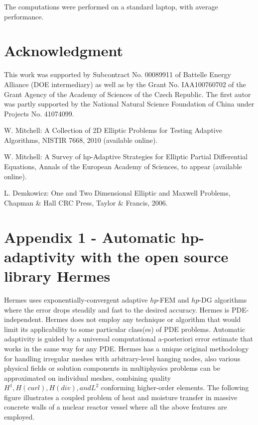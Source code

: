 \documentclass[12pt]{elsarticle}
\begin{document}
The computations were performed on a standard laptop, with average performance.

\section{Acknowledgment}

This work was supported by Subcontract No. 00089911 of Battelle
Energy Alliance (DOE intermediary) as well as by the
Grant No. IAA100760702 of the Grant Agency of the Academy
of Sciences of the Czech Republic. The first autor was partly
supported by the National Natural Science Foundation
of China under Projects No. 41074099.

\begin{thebibliography}{[KLR73]}

W. Mitchell: A Collection of 2D Elliptic Problems for
Testing Adaptive Algorithms, NISTIR 7668, 2010 (available online).

W. Mitchell: A Survey of hp-Adaptive Strategies for Elliptic Partial Differential Equations,
Annals of the European Academy of Sciences, to appear (available online).

L. Demkowicz: One and Two Dimensional Elliptic and Maxwell Problems,
Chapman \& Hall \/ CRC Press, Taylor \& Francis, 2006.

%
%
%
\end{thebibliography}

\newpage

\section{Appendix 1 - Automatic hp-adaptivity with the open source library Hermes}

Hermes uses exponentially-convergent adaptive $hp$-FEM and $hp$-DG algorithms where the error drops steadily and fast to the desired accuracy.
Hermes is PDE-independent. Hermes does not employ any technique or algorithm that would limit its applicability to some particular class(es) of PDE problems. Automatic adaptivity is guided by a universal computational a-posteriori error estimate that works in the same way for any PDE.
Hermes has a unique original methodology for handling irregular meshes with arbitrary-level hanging nodes, also various physical fields or solution components in multiphysics problems can be approximated on individual meshes, combining quality $H^1, H(curl), H(div), and L^2$ conforming higher-order elements. The following figure illustrates a coupled problem of heat and moisture transfer in massive concrete walls of a nuclear reactor vessel where all the above features are employed.
\end{document}
